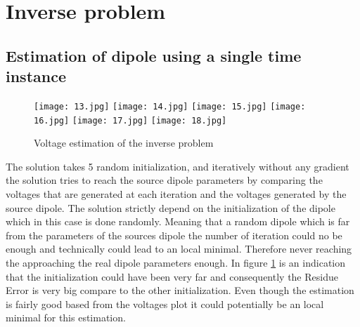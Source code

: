 \section{Inverse problem}





\subsection{Estimation of dipole using a single time instance}


\begin{figure}[!htbp]
%
\centering
\texttt{[image: 13.jpg]}
\endminipage\hfill
{}%
\centering
\texttt{[image: 14.jpg]}
\subcaption{}
\endminipage\hfill
{}%
\centering
\texttt{[image: 15.jpg]}
\subcaption{}
\endminipage\hfill
{}%
\centering
\texttt{[image: 16.jpg]}
\subcaption{}
\endminipage\hfill
{}%
\centering
\texttt{[image: 17.jpg]}
\subcaption{}
\endminipage\hfill
{}%
\centering
\texttt{[image: 18.jpg]}
\subcaption{}\label{A18}
\endminipage\hfill
\caption{Voltage estimation of the inverse problem}
\end{figure}

The solution takes 5 random initialization, and iteratively without any gradient the solution tries to reach the source dipole parameters by comparing the voltages that are generated at each iteration and the voltages generated by the source dipole. The solution strictly depend on the initialization of the dipole which in this case is done randomly. Meaning that a random dipole which is far from the parameters of the sources dipole the number of iteration could no be enough and technically could lead to an local minimal. Therefore never reaching the approaching the real dipole parameters enough. In figure \ref{A18} is an indication that the initialization could have been very far and consequently the Residue Error is very big compare to the other initialization. Even though the estimation is fairly good based from the voltages plot it could potentially be an local minimal for this estimation. 



